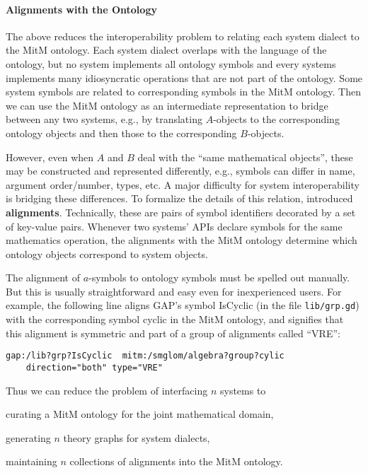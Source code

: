 
\paragraph{Alignments with the Ontology}
The above reduces the interoperability problem to relating each system dialect to the MitM ontology.
Each system dialect overlaps with the language of the ontology, but no system implements all ontology symbols and every systems implements many idiosyncratic operations that are not part of the ontology.
Some system symbols are related to corresponding symbols in the MitM ontology. Then we can use the MitM ontology as an intermediate representation to bridge between any two systems, e.g., by translating $A$-objects to the corresponding ontology objects and then those to the corresponding $B$-objects.

However, even when $A$ and $B$ deal with the ``same mathematical objects'', these may be constructed and represented differently, e.g., symbols can differ in name,
argument order/number, types, etc.
A major difficulty for system interoperability is bridging these differences.
To formalize the details of this relation, \cite{MueGauKal:cacfms17} introduced \textbf{\OMMT alignments}.
Technically, these are pairs of \OMMT symbol identifiers decorated by a set of key-value pairs.
Whenever two systems' APIs declare symbols for the same mathematics operation, the alignments with the MitM ontology determine which ontology objects correspond to system objects.

The alignment of $a$-symbols to ontology symbols must be spelled out manually.
But this is usually straightforward and easy even for inexperienced users. For example, the following line aligns GAP's symbol \textsf{IsCyclic} (in the file \lstinline|lib/grp.gd|) with the corresponding symbol \textsf{cyclic} in the MitM ontology, and signifies that this alignment is symmetric and part of a group of alignments called ``VRE'':

\begin{verbatim}
gap:/lib?grp?IsCyclic  mitm:/smglom/algebra?group?cylic
    direction="both" type="VRE"
\end{verbatim}

Thus we can reduce the problem of interfacing $n$ systems to
\begin{inparaenum}[\em i\rm)]
\item curating a MitM ontology for the joint mathematical domain,
\item generating $n$ theory graphs for system dialects,
\item maintaining $n$ collections of alignments into the MitM ontology.
\end{inparaenum}

